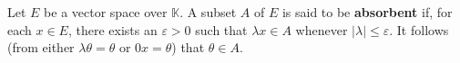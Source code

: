 Let $E$ be a vector space over $\mathbb{K}$. A subset $A$ of $E$ is said to be \textbf{absorbent} if, for each $x \in E$, there exists an $\varepsilon > 0$ such that $\lambda x \in A$ whenever $|\lambda| \leq \varepsilon$. It follows (from either $\lambda \theta = \theta$ or $0x = \theta$) that $\theta \in A$.
